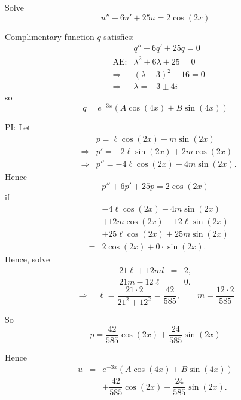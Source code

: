 \begin{example}

Solve
  \[
    u'' + 6u' + 25u = 2 \cos(2x)
  \]

  Complimentary function $q$ satisfies:
 \quad
 \begin{eqnarray*}
  && q'' + 6q' + 25q = 0\\
  &\text{AE:}& \lambda^2 + 6\lambda + 25 = 0\\
  &\Rightarrow& (\lambda+3)^2 + 16 = 0\\
  &\Rightarrow& \lambda = -3 \pm 4i
 \end{eqnarray*}
so
\[
 q = e^{-3x} (A \cos(4x) + B \sin(4x))
\]

PI: Let
\begin{eqnarray*}
 && p = \ell \cos(2x) + m \sin(2x)\\
 &\Rightarrow& p' = -2 \ell \sin(2x) + 2 m \cos(2x)\\
 &\Rightarrow& p'' = -4 \ell \cos(2x) - 4 m \sin(2x).
\end{eqnarray*}
Hence
\[
 p'' + 6p' + 25p = 2 \cos(2x)
\]
if
\begin{eqnarray*}
 && -4 \ell \cos(2x) - 4 m \sin(2x)\\
 && + 12m \cos(2x) - 12 \ell \sin(2x)\\
 && + 25 \ell \cos(2x) + 25 m \sin(2x)\\
 &=& 2 \cos(2x) +0\cdot \sin(2x).
\end{eqnarray*}
Hence, solve
\begin{eqnarray*}
21 \ell+ 12m l &=& 2,
\\
21 m -12 \ell   &=& 0.
\end{eqnarray*}
\[
 \Rightarrow \quad
 \ell =\dfrac{21\cdot2}{21^2+12^2}= \dfrac{42}{585}, \qquad m = \dfrac{12\cdot2}{585}
\]

So
\[
 p = \dfrac{42}{585} \cos(2x) + \dfrac{24}{585} \sin(2x)
\]

Hence
\begin{eqnarray*}
 u &=& e^{-3x} (A \cos(4x) + B \sin(4x))\\
 && %
+ \dfrac{42}{585} \cos(2x) + \dfrac{24}{585} \sin(2x).
\end{eqnarray*} 
 \end{example}

